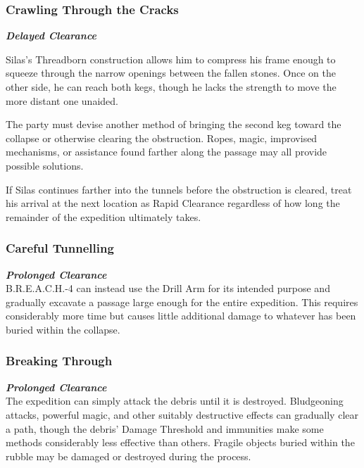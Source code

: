 \subsubsection*{Crawling Through the Cracks}
\textbf{\textit{Delayed Clearance}}\\
{\entryfont Silas's Threadborn construction allows him to compress his frame enough to squeeze through the narrow openings between the fallen stones. Once on the other side, he can reach both kegs, though he lacks the strength to move the more distant one unaided.

The party must devise another method of bringing the second keg toward the collapse or otherwise clearing the obstruction. Ropes, magic, improvised mechanisms, or assistance found farther along the passage may all provide possible solutions.

If Silas continues farther into the tunnels before the obstruction is cleared, treat his arrival at the next location as Rapid Clearance regardless of how long the remainder of the expedition ultimately takes.}
\subsubsection*{Careful Tunnelling}
\textbf{\textit{Prolonged Clearance}}\\
{\entryfont B.R.E.A.C.H.-4 can instead use the Drill Arm for its intended purpose and gradually excavate a passage large enough for the entire expedition. This requires considerably more time but causes little additional damage to whatever has been buried within the collapse.}
\subsubsection*{Breaking Through}
\textbf{\textit{Prolonged Clearance}}\\
{\entryfont The expedition can simply attack the debris until it is destroyed. Bludgeoning attacks, powerful magic, and other suitably destructive effects can gradually clear a path, though the debris' Damage Threshold and immunities make some methods considerably less effective than others. Fragile objects buried within the rubble may be damaged or destroyed during the process.}

